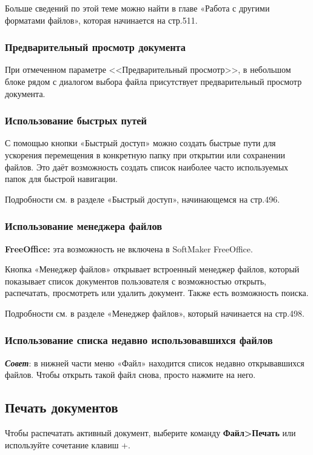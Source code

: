 \documentclass[a4paper,10pt]{article}
\begin{document}
Больше сведений по этой теме можно найти в главе «Работа с другими форматами файлов», которая начинается на стр.511.

\subsubsection{Предварительный просмотр документа}
При отмеченном параметре <<Предварительный просмотр>>, в небольшом блоке рядом с диалогом выбора файла присутствует предварительный просмотр документа.

\subsubsection{Использование быстрых путей}
С помощью кнопки «Быстрый доступ» можно создать быстрые пути для ускорения перемещения в конкретную папку при открытии или сохранении файлов. Это даёт возможность создать список наиболее часто используемых папок для быстрой навигации.

Подробности см. в разделе «Быстрый доступ», начинающемся на стр.496.

\subsubsection{Использование менеджера файлов}
\begin{mdframed}[backgroundcolor=pink!50]
\textbf{FreeOffice:} эта возможность не включена в SoftMaker FreeOffice.
\end{mdframed}

Кнопка «Менеджер файлов» открывает встроенный менеджер файлов, который показывает список документов пользователя с возможностью открыть, распечатать, просмотреть или удалить документ. Также есть возможность поиска.

Подробности см. в разделе «Менеджер файлов», который начинается на стр.498.

\subsubsection{Использование списка недавно использовавшихся файлов}
\textit{\textbf{Совет}}: в нижней части меню «Файл» находится список недавно открывавшихся файлов. Чтобы открыть такой файл снова, просто нажмите на него.

\subsection{Печать документов}
Чтобы распечатать активный документ, выберите команду \textbf{Файл>Печать} или используйте сочетание клавиш +.
\end{document}
